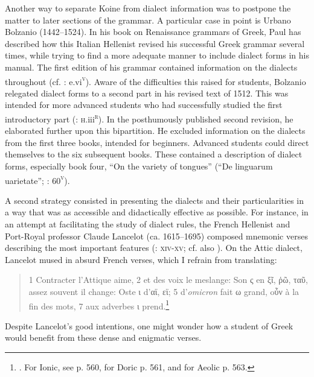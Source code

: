 Another way to separate Koine from dialect information was to postpone the matter to later sections of the grammar. A particular case in point is Urbano Bolzanio (1442–1524). In his book on Renaissance grammars of Greek, Paul \citet[36--40]{Botley2010} has described how this Italian Hellenist revised his successful Greek grammar several times, while trying to find a more adequate manner to include dialect forms in his manual. The first edition of his grammar contained information on the dialects throughout (cf. \citealt{Bolzanio1497}: e.vi\textsc{\textsuperscript{v}}). Aware of the difficulties this raised for students, Bolzanio relegated dialect forms to a second part in his revised text of 1512. This was intended for more advanced students who had successfully studied the first introductory part (\citealt{Bolzanio1512}: \textsc{h}.iii\textsc{\textsuperscript{r}}). In the posthumously published second revision, he elaborated further upon this bipartition. He excluded information on the dialects from the first three books, intended for beginners. Advanced students could direct themselves to the six subsequent books. These contained a description of dialect forms, especially book four, “On the variety of tongues” (“De linguarum uarietate”; \citealt{Bolzanio1545}: 60\textsc{\textsuperscript{v}}).

A second strategy consisted in presenting the dialects and their particularities in a way that was as accessible and didactically effective as possible. For instance, in an attempt at facilitating the study of dialect rules, the French Hellenist and Port-Royal professor Claude Lancelot (ca. 1615–1695) composed mnemonic verses describing the most important features (\citealt{Lancelot1655}: \textsc{xiv-xv;} cf. also \citealt{Anon.1725}). On the Attic dialect, Lancelot mused in absurd French verses, which I refrain from translating:

\begin{quote}\raggedright
1 Contracter l’Attique aime, 2 et des voix le meslange: Son ς en ξῖ, ῥῶ, ταῦ, assez souvent il change: Oste ι d’αϊ, εϊ; 5 d’\textit{omicron} fait ω grand, oὖν à la fin des mots, 7 aux adverbes ι prend.\footnote{\citet[558]{Lancelot1655}. For Ionic, see p. 560, for Doric p. 561, and for Aeolic p. 563.}
\end{quote}

Despite Lancelot’s good intentions, one might wonder how a student of Greek would benefit from these dense and enigmatic verses.

